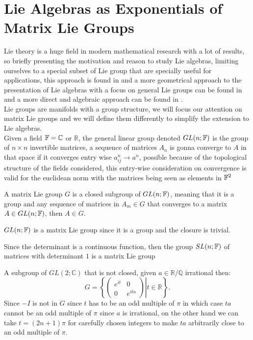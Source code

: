\section{Lie Algebras as Exponentials of Matrix Lie Groups}
Lie theory is a huge field in modern mathematical research with a lot of results, so briefly presenting the motivation and reason to study Lie algebras, limiting ourselves to a special subset of Lie group that are specially useful for applications, this approach is found in \cite{brian} and a more geometrical approach to the presentation of Lie algebras with a focus on general Lie groups can be found in \cite{kirillov} and a more direct and algebraic approach can be found in \cite{kac}.\\
Lie groups are manifolds with a group structure, we will focus our attention on matrix Lie groups and we will define them differently to simplify the extension to Lie algebras.\\
Given a field $\mathbb{F}=\mathbb{C}$ or $\mathbb{R}$, the general linear group denoted $GL(n;\mathbb{F})$ is the group of $n\times n$ invertible matrices, a sequence of matrices $A_n$ is gonna converge to $A$ in that space if it converges entry wise $a^n_{ij} \rightarrow a^n$, possible because of the topological structure of the fields considered, this entry-wise consideration on convergence is valid for the euclidean norm with the matrices being seen as elements in $\mathbb{F}^2$
\begin{defi}
	A matrix Lie group $G$ is a closed subgroup of $GL(n;\mathbb{F})$, meaning that it is a group and any sequence of matrices in $A_m \in G$ that converges to a matrix $A \in GL(n;\mathbb{F})$, then $A \in G$.
	\label{MATRIXLIEGROUPDEF}
\end{defi}
\begin{ex}
	$GL(n;\mathbb{F})$ is a matrix Lie group since it is a group and the closure is trivial.
\end{ex}
\begin{ex}
Since the determinant is a continuous function, then the group $SL(n;\mathbb{F})$ of matrices with determinant $1$ is a matrix Lie group
\end{ex}
\begin{ex}A subgroup of $GL(2;\mathbb{C})$ that is not closed, given $a\in \mathbb{R}/\mathbb{Q}$ irrational then:
		$$G=\left\{\left.\begin{pmatrix}
		e^{it} & 0 \\
		0 & e^{ita}	\end{pmatrix} \right| t \in \mathbb{R}\right\}.$$
		Since $-I$ is not in $G$ since $t$ has to be an odd multiple of $\pi$ in which case $ta$ cannot be an odd multiple of $\pi$ since $a$ is irrational, on the other hand we can take $t=(2n+1)\pi$ for carefully chosen integers to make $ta$ arbitrarily close to an odd multiple of $\pi$.\\
\end{ex}

